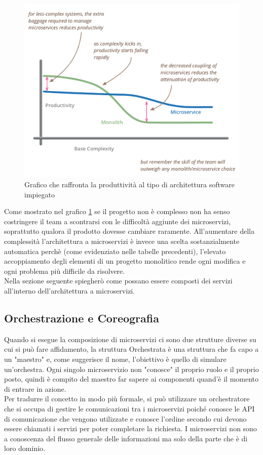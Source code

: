 \begin{figure}[h]
    \centering
    \includegraphics[width=450px]{./images/microserviceComplexity.png}
    \caption{Grafico che raffronta la produttività al tipo di architettura software impiegato}
    \label{fig:complexity}
\end{figure}

Come mostrato nel grafico \ref{fig:complexity} se il progetto non è complesso non ha senso costringere il team a scontrarsi con le difficoltà aggiunte dei microservizi, soprattutto qualora il prodotto dovesse cambiare raramente. All'aumentare della complessità l'architettura a microservizi è invece una scelta sostanzialmente automatica perchè (come evidenziato nelle tabelle precedenti), l'elevato accoppiamento degli elementi di un progetto monolitico rende ogni modifica e ogni problema più difficile da risolvere.
\\
Nella sezione seguente spiegherò come possano essere composti dei servizi all'interno dell'architettura a microservizi.

\subsection{Orchestrazione e Coreografia}
Quando si esegue la composizione di microservizi ci sono due strutture diverse su cui si può fare affidamento, la struttura Orchestrata è una struttura che fa capo a un "maestro" e, come suggerisce il nome, l'obiettivo è quello di simulare un'orchestra. Ogni singolo microservizio non "conosce" il proprio ruolo e il proprio posto, quindi è compito del maestro far sapere ai componenti quand'è il momento di entrare in azione.
\\
Per tradurre il concetto in modo più formale, si può utilizzare un orchestratore che si occupa di gestire le comunicazioni tra i microservizi poiché conosce le API di comunicazione che vengono utilizzate e conosce l'ordine secondo cui devono essere chiamati i servizi per poter completare la richiesta. I microservizi non sono a conoscenza del flusso generale delle informazioni ma solo della parte che è di loro dominio. \cite{AzureCloudPatterns}

